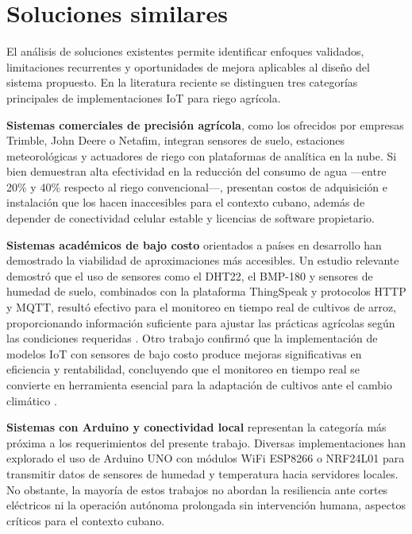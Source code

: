 \section{Soluciones similares}\label{sec:similares}

El análisis de soluciones existentes permite identificar enfoques validados, limitaciones recurrentes y oportunidades de mejora aplicables al diseño del sistema propuesto. En la literatura reciente se distinguen tres categorías principales de implementaciones IoT para riego agrícola.

\textbf{Sistemas comerciales de precisión agrícola}, como los ofrecidos por empresas Trimble, John Deere o Netafim, integran sensores de suelo, estaciones meteorológicas y actuadores de riego con plataformas de analítica en la nube. Si bien demuestran alta efectividad en la reducción del consumo de agua ---entre 20\% y 40\% respecto al riego convencional---, presentan costos de adquisición e instalación que los hacen inaccesibles para el contexto cubano, además de depender de conectividad celular estable y licencias de software propietario.

\textbf{Sistemas académicos de bajo costo} orientados a países en desarrollo han demostrado la viabilidad de aproximaciones más accesibles. Un estudio relevante demostró que el uso de sensores como el DHT22, el BMP-180 y sensores de humedad de suelo, combinados con la plataforma ThingSpeak y protocolos HTTP y MQTT, resultó efectivo para el monitoreo en tiempo real de cultivos de arroz, proporcionando información suficiente para ajustar las prácticas agrícolas según las condiciones requeridas \citep{lozano2024desarrollo}. Otro trabajo confirmó que la implementación de modelos IoT con sensores de bajo costo produce mejoras significativas en eficiencia y rentabilidad, concluyendo que el monitoreo en tiempo real se convierte en herramienta esencial para la adaptación de cultivos ante el cambio climático \citep{lozano2024desarrollo}.

\textbf{Sistemas con Arduino y conectividad local} representan la categoría más próxima a los requerimientos del presente trabajo. Diversas implementaciones han explorado el uso de Arduino UNO con módulos WiFi ESP8266 o NRF24L01 para transmitir datos de sensores de humedad y temperatura hacia servidores locales. No obstante, la mayoría de estos trabajos no abordan la resiliencia ante cortes eléctricos ni la operación autónoma prolongada sin intervención humana, aspectos críticos para el contexto cubano.

